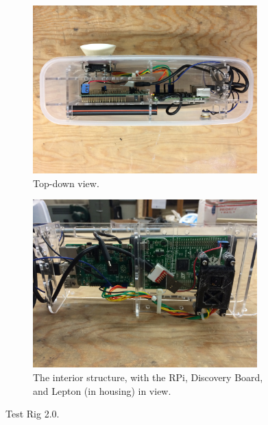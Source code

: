 \begin{figure}
\centering
\begin{subfigure}{0.4\textwidth}
 \centering
 \includegraphics[width=0.95\textwidth, angle= 180]{"./image/testrig2_top"}
 \caption{Top-down view.}
 \label{fig:testrig2_testing:sub1}
\end{subfigure}
\begin{subfigure}{0.4\textwidth}
 \centering
 \includegraphics[width=0.95\textwidth, angle= 180]{"./image/testrig2_interior"}
 \caption{The interior structure, with the RPi, Discovery Board, and Lepton (in housing) in view.}
 \label{fig:testrig2_testing:sub2}
\end{subfigure}
\caption{Test Rig 2.0.}
\label{fig:testrig2_testing}
\end{figure}

